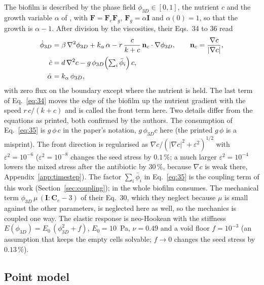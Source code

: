 \documentclass[11pt,a4paper]{article}
\newcommand{\phiD}{\phi_{3D}}
\newcommand{\lv}{\textstyle\sum_i\bar\phi_i}
\newcommand{\nc}{\mathbf n_c}
\begin{document}
The biofilm is described by the phase field $\phiD\in[0,1]$, the nutrient $c$ and the growth variable $\alpha$ of \citet{Klempt2024DiffusionDrivenGrowth}, with $\mathbf F=\mathbf F_e\mathbf F_g$, $\mathbf F_g=\alpha\mathbf I$ and $\alpha(0)=1$, so that the growth is $\alpha-1$. After division by the viscosities, their Eqs.~34 to 36 read
\begin{align}
\dot\phiD &= \beta\,\nabla^2\phiD + k_\alpha\,\alpha - r\,\frac{c}{k+c}\,\nc\cdot\nabla\phiD, \qquad \nc=\frac{\nabla c}{|\nabla c|}, \label{eq:34}\\
\dot c &= d\,\nabla^2 c - g\,\phiD\Bigl(\lv\Bigr)\,c, \label{eq:35}\\
\dot\alpha &= k_\alpha\,\phiD, \label{eq:36}
\end{align}
with zero flux on the boundary except where the nutrient is held. The last term of Eq.~\eqref{eq:34} moves the edge of the biofilm up the nutrient gradient with the speed $r\,c/(k+c)$ and is called the front term here. Two details differ from the equations as printed, both confirmed by the authors. The consumption of Eq.~\eqref{eq:35} is $g\,\phi\,c$ in the paper's notation, $g\,\phiD c$ here (the printed $g\,\phi$ is a misprint). The front direction is regularised as $\nabla c/(|\nabla c|^2+\varepsilon^2)^{1/2}$ with $\varepsilon^2=10^{-6}$ ($\varepsilon^2=10^{-8}$ changes the seed stress by $0.1\,\%$; a much larger $\varepsilon^2=10^{-4}$ lowers the mixed stress after the antibiotic by $30\,\%$, because $\nabla c$ is weak there, Appendix~\ref{app:timestep}). The factor $\lv$ in Eq.~\eqref{eq:35} is the coupling term of this work (Section~\ref{sec:coupling}); in \citet{Klempt2024DiffusionDrivenGrowth} the whole biofilm consumes. The mechanical term $\phiD\,\mu\,(\mathbf I:\mathbf C_e-3)$ of their Eq.~30, which they neglect because $\mu$ is small against the other parameters, is neglected here as well, so the mechanics is coupled one way. The elastic response is neo-Hookean with the stiffness $E(\phiD)=E_0\,(\phiD^2+f)$, $E_0=10$~Pa, $\nu=0.49$ and a void floor $f=10^{-3}$ (an assumption that keeps the empty cells solvable; $f\to0$ changes the seed stress by $0.13\,\%$).

\subsection{Point model}
\label{sec:point}
\end{document}
